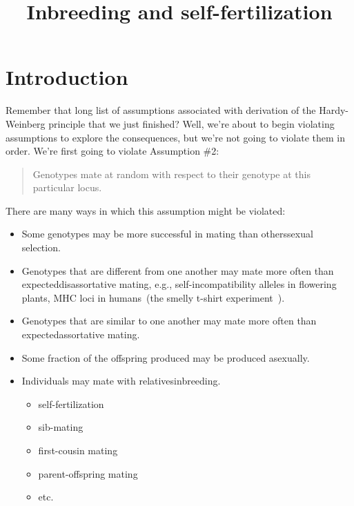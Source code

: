 \documentclass[12pt]{article}
\title{Inbreeding and self-fertilization}
\begin{document}
\maketitle

\thispagestyle{first}

\section*{Introduction}

Remember that long list of assumptions associated with derivation of
the Hardy-Weinberg principle that we just finished? Well, we're about
to begin violating assumptions to explore the consequences, but we're
not going to violate them in order. We're first going to violate
Assumption \#2:

\begin{quote}
Genotypes mate at random with respect to their genotype at this
particular locus.
\end{quote}

\noindent There are many ways in which this assumption might be
violated:

\begin{itemize}

\item Some genotypes may be more successful in mating than
  others{\dash}sexual selection.

\item Genotypes that are different from one another may mate more
  often than expected{\dash}disassortative mating, e.g.,
  self-incompatibility alleles in flowering plants, MHC loci in
  humans~(the smelly t-shirt
  experiment~\cite{Wedekind-etal-1995}).

\item Genotypes that are similar to one another may mate more often
  than expected{\dash}assortative mating.

\item Some fraction of the offspring produced may be produced
  asexually.

\item Individuals may mate with
  relatives{\dash}inbreeding.

\begin{itemize}

\item self-fertilization

\item sib-mating

\item first-cousin mating

\item parent-offspring mating

\item etc.

\end{itemize}

\end{itemize}
\end{document}
